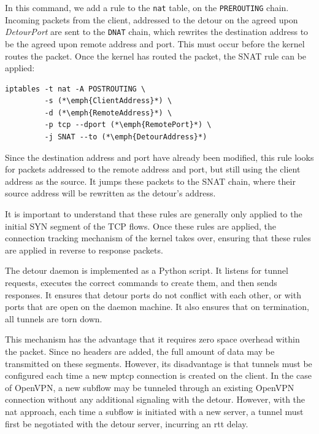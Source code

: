 \documentclass{cwru}
\begin{document}
In this command, we add a rule to the \texttt{nat} table, on the
\texttt{PREROUTING} chain. Incoming packets from the client, addressed to the
detour on the agreed upon \textit{DetourPort} are sent to the \texttt{DNAT}
chain, which rewrites the destination address to be the agreed upon remote
address and port. This must occur before the kernel routes the packet. Once the
kernel has routed the packet, the SNAT rule can be applied:

\begin{minipage}{\linewidth} %
\begin{lstlisting}
iptables -t nat -A POSTROUTING \
         -s (*\emph{ClientAddress}*) \
         -d (*\emph{RemoteAddress}*) \
         -p tcp --dport (*\emph{RemotePort}*) \
         -j SNAT --to (*\emph{DetourAddress}*)
\end{lstlisting}
\end{minipage}

Since the destination address and port have already been modified, this rule
looks for packets addressed to the remote address and port, but still using the
client address as the source. It jumps these packets to the SNAT chain, where
their source address will be rewritten as the detour's address.

It is important to understand that these rules are generally only applied to the
initial SYN segment of the TCP flows. Once these rules are applied, the
connection tracking mechanism of the kernel takes over, ensuring that these
rules are applied in reverse to response packets.

The detour daemon is implemented as a Python script. It listens for tunnel
requests, executes the correct commands to create them, and then sends
responses. It ensures that detour ports do not conflict with each other, or with
ports that are open on the daemon machine. It also ensures that on termination,
all tunnels are torn down.

This mechanism has the advantage that it requires zero space overhead within the
packet. Since no headers are added, the full amount of data may be transmitted
on these segments. However, its disadvantage is that tunnels must be configured
each time a new \ac{mptcp} connection is created on the client. In the case of
OpenVPN, a new subflow may be tunneled through an existing OpenVPN connection
without any additional signaling with the detour. However, with the \ac{nat}
approach, each time a subflow is initiated with a new server, a tunnel must
first be negotiated with the detour server, incurring an \ac{rtt} delay.
\end{document}
